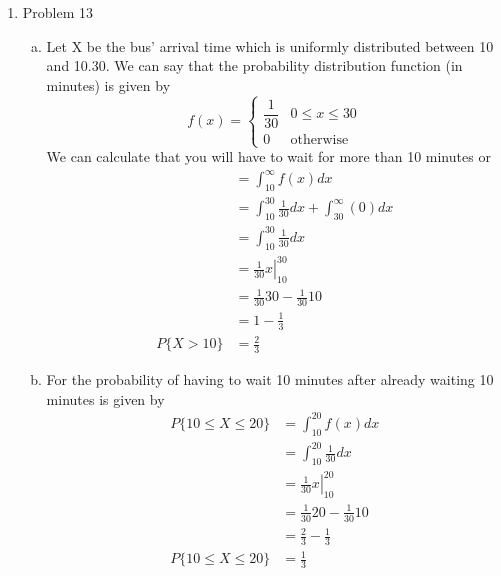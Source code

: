 \documentclass[11pt]{article}
\begin{document}
\begin{enumerate}
\item Problem 13
\begin{enumerate}[(a)]
\item
Let X be the bus' arrival time which is uniformly distributed between 10 and 10.30. We can say that the probability distribution function (in minutes) is given by
$$f(x)= \left\{\begin{array}{cc}
	\dfrac{1}{30} 	&0\le x\le 30\\
	0		&\mbox{otherwise}
	\end{array}\right.$$
We can calculate that you will have to wait for more than 10 minutes or
\begin{align*}
&= \int_{10}^{\infty}f(x)dx\\
 &= \int_{10}^{30}\frac{1}{30}dx + \int_{30}^{\infty}(0)dx\\
 &= \int_{10}^{30}\frac{1}{30}dx \\
 &= \left.\frac{1}{30}x\right|_{10}^{30} \\
 &= \frac{1}{30}30 - \frac{1}{30}10 \\
 &= 1 - \frac{1}{3} \\
P\{X>10\} &= \frac{2}{3} 
\end{align*}

\item
For the probability of having to wait 10 minutes after already waiting 10 minutes is given by
\begin{align*}
P\{10\le X\le20\} &= \int_{10}^{20}f(x)dx\\
&= \int_{10}^{20}\frac{1}{30}dx\\
&= \left.\frac{1}{30}x\right|_{10}^{20}\\
&= \frac{1}{30}20 - \frac{1}{30}10\\
&= \frac{2}{3} - \frac{1}{3}\\
P\{10\le X\le20\}&= \frac{1}{3} 
\end{align*}
\end{enumerate}

\end{enumerate}
\end{document}
